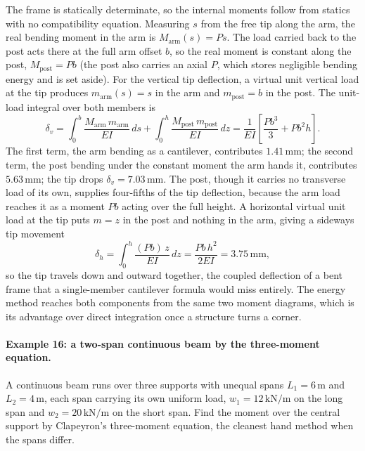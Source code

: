 The frame is statically determinate, so the internal moments follow from
statics with no compatibility equation. Measuring $s$ from the free tip
along the arm, the real bending moment in the arm is $M_{\text{arm}}(s) =
P s$. The load carried back to the post acts there at the full arm offset
$b$, so the real moment is constant along the post, $M_{\text{post}} =
P b$ (the post also carries an axial $P$, which stores negligible bending
energy and is set aside). For the vertical tip deflection, a virtual unit
vertical load at the tip produces $m_{\text{arm}}(s) = s$ in the arm and
$m_{\text{post}} = b$ in the post. The unit-load integral over both
members is
\[
\delta_v = \int_0^b \frac{M_{\text{arm}}\,m_{\text{arm}}}{EI}\,ds
+ \int_0^h \frac{M_{\text{post}}\,m_{\text{post}}}{EI}\,dz
= \frac{1}{EI}\left[\frac{P b^3}{3} + P b^2 h\right].
\]
The first term, the arm bending as a cantilever, contributes
$1.41\,\si{\milli\meter}$; the second term, the post bending under the
constant moment the arm hands it, contributes $5.63\,\si{\milli\meter}$;
the tip drops $\delta_v = 7.03\,\si{\milli\meter}$. The post, though it
carries no transverse load of its own, supplies four-fifths of the tip
deflection, because the arm load reaches it as a moment $Pb$ acting over
the full height. A horizontal virtual unit load at the tip puts $m =
z$ in the post and nothing in the arm, giving a sideways tip movement
\[
\delta_h = \int_0^h \frac{(P b)\,z}{EI}\,dz = \frac{P b\,h^2}{2 EI}
= 3.75\,\si{\milli\meter},
\]
so the tip travels down and outward together, the coupled deflection of
a bent frame that a single-member cantilever formula would miss entirely.
The energy method reaches both components from the same two moment
diagrams, which is its advantage over direct integration once a structure
turns a corner.





\paragraph{Example 16: a two-span continuous beam by the three-moment
equation.} A continuous beam runs over three supports with unequal spans
$L_1 = 6\,\si{\meter}$ and $L_2 = 4\,\si{\meter}$, each span carrying its
own uniform load, $w_1 = 12\,\text{kN}/\text{m}$ on the long span and
$w_2 = 20\,\text{kN}/\text{m}$ on the short span. Find the moment over the
central support by Clapeyron's three-moment equation, the cleanest hand
method when the spans differ.


